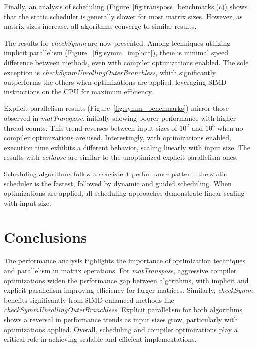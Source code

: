 \documentclass[conference]{IEEEtran}
\begin{document}
Finally, an analysis of scheduling (Figure~\ref{fig:transpose_benchmarks}(c)) shows that the static scheduler is generally slower for most matrix sizes. However, as matrix sizes increase, all algorithms converge to similar results.


The results for \textit{checkSymm} are now presented. Among techniques utilizing implicit parallelism (Figure ~\ref{fig:symm_implicit}), there is minimal speed difference between methods, even with compiler optimizations enabled. The sole exception is \textit{checkSymmUnrollingOuterBranchless}, which significantly outperforms the others when optimizations are applied, leveraging SIMD instructions on the CPU for maximum efficiency.

Explicit parallelism results (Figure~\ref{fig:symm_benchmarks}) mirror those observed in \textit{matTranspose}, initially showing poorer performance with higher thread counts. This trend reverses between input sizes of $10^2$ and $10^3$ when no compiler optimizations are used. Interestingly, with optimizations enabled, execution time exhibits a different behavior, scaling linearly with input size. The results with \textit{collapse} are similar to the unoptimized explicit parallelism ones. 

Scheduling algorithms follow a consistent performance pattern: the static scheduler is the fastest, followed by dynamic and guided scheduling. When optimizations are applied, all scheduling approaches demonstrate linear scaling with input size.



\section{Conclusions}

The performance analysis highlights the importance of optimization techniques and parallelism in matrix operations. For \textit{matTranspose}, aggressive compiler optimizations widen the performance gap between algorithms, with implicit and explicit parallelism improving efficiency for larger matrices. Similarly, \textit{checkSymm} benefits significantly from SIMD-enhanced methods like \textit{checkSymmUnrollingOuterBranchless}. Explicit parallelism for both algorithms shows a reversal in performance trends as input sizes grow, particularly with optimizations applied. Overall, scheduling and compiler optimizations play a critical role in achieving scalable and efficient implementations.
\end{document}
